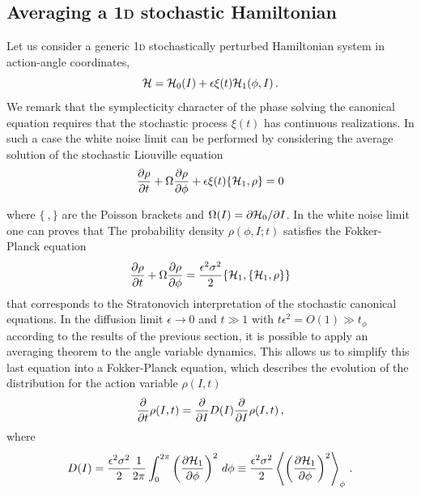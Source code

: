 \subsection{Averaging a 1\textsc{d} stochastic Hamiltonian}
\label{ssc:averaging-1D}

Let us consider a generic 1\textsc{d} stochastically perturbed Hamiltonian system in action-angle coordinates,
\begin{equation}
	\mathcal{H} = \mathcal{H}_0(I) + \epsilon \xi(t) \mathcal{H}_1(\phi, I) \,.
\end{equation}
We remark that the symplecticity character of the phase solving the canonical equation requires that the stochastic process $\xi(t)$ has continuous realizations. In such a case the white noise limit can be performed by considering the average solution of the stochastic Liouville equation
\begin{equation}
	\pdv{\rho}{t}\/ + \Omega \pdv{\rho}{\phi}\/ +\epsilon \xi(t)\{\mathcal{H}_1,\rho\}=0
\end{equation}

where \(\{\ ,\}\) are the Poisson brackets and \(\Omega(I) = \partial \mathcal{H}_0/\partial I\).
In the white noise limit one can proves that The probability density \(\rho(\phi, I; t)\)  satisfies the Fokker-Planck equation
\begin{equation}
	\pdv{\rho}{t}\/ + \Omega \pdv{\rho}{\phi}\/ = \frac{\epsilon^2 \sigma^2}{2}\{\mathcal{H}_1, \{\mathcal{H}_1,\rho\}\}
	\label{eq:stoc_ham_complex_starting}
\end{equation}
that corresponds to the Stratonovich interpretation of the stochastic canonical equations. In the diffusion limit $\epsilon\to 0$ and $t\gg 1$ with
$t\epsilon^2=O(1)\gg t_{\phi}$ according to the results of the previous section, it is possible to apply an averaging theorem to the angle variable dynamics. This allows us to simplify this last equation into a Fokker-Planck equation, which describes the evolution of the distribution for the action variable \(\rho(I,t)\)
\begin{equation}
	\pdv{}{t}\/\rho(I,t) = \pdv{}{I}\/D(I)\pdv{}{I}\/\rho(I,t) \,,
\end{equation}
where
\begin{equation}
	D(I) = \frac{\epsilon^2 \sigma^2}{2}\frac{1}{2\pi}\int_0^{2\pi}\left(\pdv{\mathcal{H}_1}{\phi}\/\right)^2 \,d\phi \equiv \frac{\epsilon^2 \sigma^2}{2} \left\langle \left( \pdv{\mathcal{H}_1}{\phi}\/  \right)^2 \right\rangle_\phi \,.
\end{equation}

